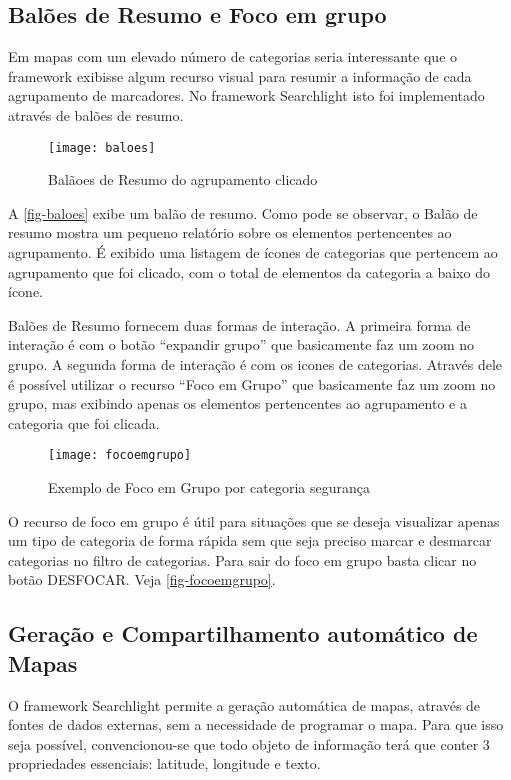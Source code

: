 \subsection{Balões de Resumo e Foco em grupo}
Em mapas com um elevado número de  categorias seria interessante que o framework exibisse algum recurso visual para resumir a informação de cada agrupamento de marcadores. 
No framework Searchlight isto foi implementado através de balões de resumo.

\begin{figure}[htb]
	\caption{\label{fig-baloes}Balãoes de Resumo do agrupamento clicado}
	\begin{center}
	    \texttt{[image: baloes]}
	\end{center}
\end{figure}

A \autoref{fig-baloes} exibe um balão de resumo. Como pode se observar, o Balão de resumo mostra um pequeno relatório sobre os elementos pertencentes ao agrupamento. É exibido uma listagem de ícones de categorias que pertencem ao agrupamento que foi clicado, com o total de elementos da categoria a baixo do ícone. 


Balões de Resumo fornecem duas formas de interação. A primeira forma de interação é com o botão ``expandir grupo'' que basicamente faz um zoom no grupo. A segunda forma de interação é com os icones de categorias. Através dele é possível utilizar o recurso ``Foco em Grupo'' que basicamente faz um zoom no grupo, mas exibindo apenas os elementos pertencentes ao agrupamento e a categoria que foi clicada.

 \begin{figure}[htb]
	\caption{\label{fig-focoemgrupo}Exemplo de Foco em Grupo por categoria segurança}
	\begin{center}
	    \texttt{[image: focoemgrupo]}
	\end{center}
\end{figure}

O recurso de foco em grupo é útil para situações que se deseja visualizar apenas um tipo de categoria de forma rápida sem que seja preciso marcar e desmarcar categorias no filtro de categorias. Para sair do foco em grupo basta clicar no botão DESFOCAR. Veja \autoref{fig-focoemgrupo}.


\subsection{Geração e Compartilhamento automático de Mapas}
O framework Searchlight permite a geração automática de mapas, através de fontes de dados externas, sem a necessidade de programar o mapa. Para que isso seja possível, convencionou-se que todo objeto de informação terá que conter 3 propriedades essenciais: latitude, longitude e texto.  

